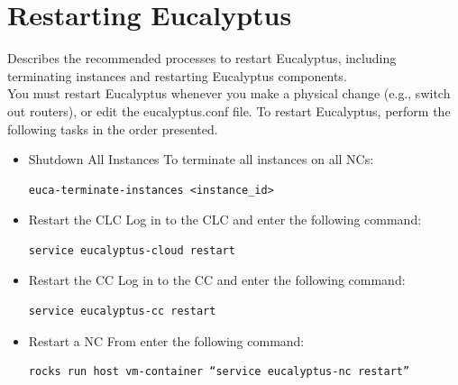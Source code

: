 \section{Restarting Eucalyptus}
Describes the recommended processes to restart Eucalyptus, including terminating instances and restarting Eucalyptus components.\\ \linebreak
You must restart Eucalyptus whenever you make a physical change (e.g., switch out routers), or edit the eucalyptus.conf file. To restart Eucalyptus, perform the following tasks in the order presented. \\
\begin{itemize}
\item Shutdown All Instances
To terminate all instances on all NCs:
\begin{lstlisting}
euca-terminate-instances <instance_id>
\end{lstlisting}
\item Restart the CLC
Log in to the CLC and enter the following command:
\begin{lstlisting}
service eucalyptus-cloud restart
\end{lstlisting}
\item Restart the CC
Log in to the CC and enter the following command:
\begin{lstlisting}
service eucalyptus-cc restart
\end{lstlisting}
\item Restart a NC
From enter the following command:
\begin{lstlisting}
rocks run host vm-container “service eucalyptus-nc restart”
\end{lstlisting}
\end{itemize}
